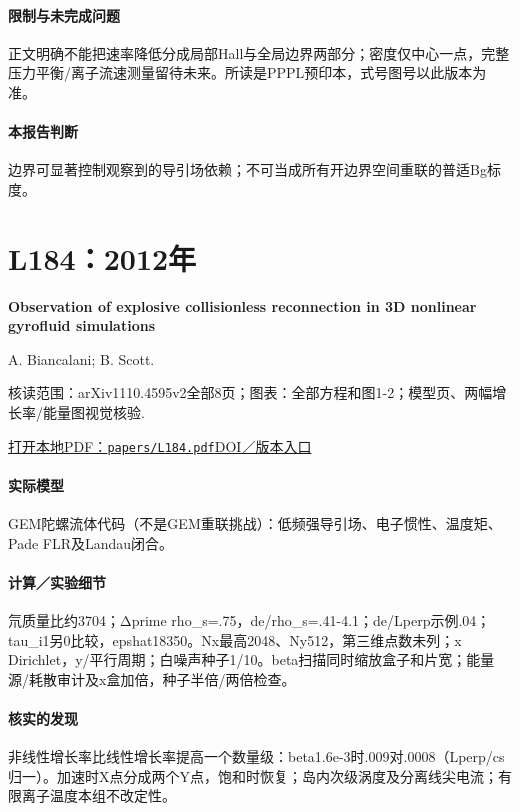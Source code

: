 \paragraph{限制与未完成问题}正文明确不能把速率降低分成局部Hall与全局边界两部分；密度仅中心一点，完整压力平衡/离子流速测量留待未来。所读是PPPL预印本，式号图号以此版本为准。

\paragraph{本报告判断}边界可显著控制观察到的导引场依赖；不可当成所有开边界空间重联的普适Bg标度。

\section{L184：2012年}\label{paper:L184}

\textbf{Observation of explosive collisionless reconnection in 3D nonlinear gyrofluid simulations}\citep{L184}\

A. Biancalani;  B. Scott.

\textsf{核读范围：}arXiv1110.4595v2全部8页；\textsf{图表：}全部方程和图1-2；模型页、两幅增长率/能量图视觉核验.

\href{run:papers/L184.pdf}{打开本地PDF：\texttt{papers/L184.pdf}}\quad\href{https://doi.org/10.1209/0295-5075/97/15005}{DOI／版本入口}

\paragraph{实际模型}GEM陀螺流体代码（不是GEM重联挑战）：低频强导引场、电子惯性、温度矩、Pade FLR及Landau闭合。

\paragraph{计算／实验细节}氘质量比约3704；Δprime rho\_s=.75，de/rho\_s=.41-4.1；de/Lperp示例.04；tau\_i1另0比较，epshat18350。Nx最高2048、Ny512，第三维点数未列；x Dirichlet，y/平行周期；白噪声种子1/10。beta扫描同时缩放盒子和片宽；能量源/耗散审计及x盒加倍，种子半倍/两倍检查。

\paragraph{核实的发现}非线性增长率比线性增长率提高一个数量级：beta1.6e-3时.009对.0008（Lperp/cs归一）。加速时X点分成两个Y点，饱和时恢复；岛内次级涡度及分离线尖电流；有限离子温度本组不改定性。

